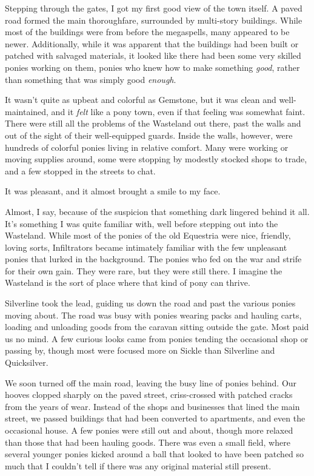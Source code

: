 Stepping through the gates, I got my first good view of the town itself. A paved road formed the main thoroughfare, surrounded by multi-story buildings. While most of the buildings were from before the megaspells, many appeared to be newer. Additionally, while it was apparent that the buildings had been built or patched with salvaged materials, it looked like there had been some very skilled ponies working on them, ponies who knew how to make something \textit{good}, rather than something that was simply good \textit{enough}.

It wasn’t quite as upbeat and colorful as Gemstone, but it was clean and well-maintained, and it \textit{felt} like a pony town, even if that feeling was somewhat faint. There were still all the problems of the Wasteland out there, past the walls and out of the sight of their well-equipped guards. Inside the walls, however, were hundreds of colorful ponies living in relative comfort. Many were working or moving supplies around, some were stopping by modestly stocked shops to trade, and a few stopped in the streets to chat.

It was pleasant, and it almost brought a smile to my face.

Almost, I say, because of the suspicion that something dark lingered behind it all. It’s something I was quite familiar with, well before stepping out into the Wasteland. While most of the ponies of the old Equestria were nice, friendly, loving sorts, Infiltrators became intimately familiar with the few unpleasant ponies that lurked in the background. The ponies who fed on the war and strife for their own gain. They were rare, but they were still there. I imagine the Wasteland is the sort of place where that kind of pony can thrive.

Silverline took the lead, guiding us down the road and past the various ponies moving about. The road was busy with ponies wearing packs and hauling carts, loading and unloading goods from the caravan sitting outside the gate. Most paid us no mind. A few curious looks came from ponies tending the occasional shop or passing by, though most were focused more on Sickle than Silverline and Quicksilver.

We soon turned off the main road, leaving the busy line of ponies behind. Our hooves clopped sharply on the paved street, criss-crossed with patched cracks from the years of wear. Instead of the shops and businesses that lined the main street, we passed buildings that had been converted to apartments, and even the occasional house. A few ponies were still out and about, though more relaxed than those that had been hauling goods. There was even a small field, where several younger ponies kicked around a ball that looked to have been patched so much that I couldn’t tell if there was any original material still present.

